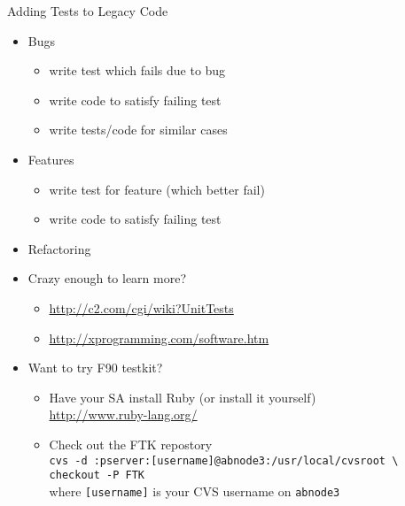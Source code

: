 \documentclass[landscape]{slides}
\begin{document}
\begin{slide}
  {\Large Adding Tests to Legacy Code}
  \vspace{0.5in}
  \begin{itemize}
   \item Bugs
     \begin{itemize}
      \item write test which fails due to bug
      \item write code to satisfy failing test
      \item write tests/code for similar cases
     \end{itemize}
   \item Features
     \begin{itemize}
      \item write test for feature {\small (which better fail)}
      \item write code to satisfy failing test
     \end{itemize}
   \item Refactoring
  \end{itemize}
\end{slide}
\begin{slide}
  \begin{center}
   \begin{itemize}
    \item Crazy enough to learn more?
     \begin{itemize}
      \item \url{http://c2.com/cgi/wiki?UnitTests}\\[-10pt]
      \item \url{http://xprogramming.com/software.htm}
     \end{itemize}
    \item Want to try F90 testkit?
     \begin{itemize}
      \item Have your SA install Ruby (or install it yourself)\\[5pt]
       \hspace{1em}\url{http://www.ruby-lang.org/}
      \item Check out the FTK repostory\\[5pt]
       \hspace{1em}\verb+cvs -d :pserver:[username]@abnode3:/usr/local/cvsroot \+\\
       \hspace{1em}\verb+checkout -P FTK+\\[5pt]
       where \verb+[username]+ is your CVS username on \verb+abnode3+
     \end{itemize}
   \end{itemize}
  \end{center}
\end{slide}
\end{document}
